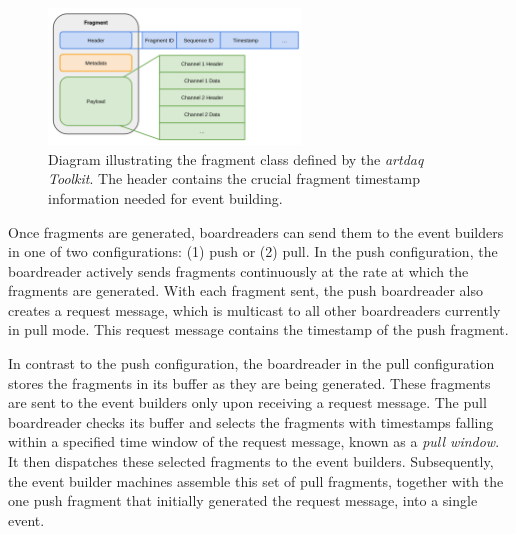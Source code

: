 \begin{figure}[tbp!] 
\centering    
\includegraphics[width=0.6\textwidth]{Fragment_Diagram}
\caption[FragmentDiagram]{
Diagram illustrating the fragment class defined by the \textit{artdaq Toolkit}. 
The header contains the crucial fragment timestamp information needed for event building.  
}
\label{fig:fragmentDiagram}
\end{figure}


Once fragments are generated, boardreaders can send them to the event builders in one of two configurations: (1) push or (2) pull.
In the push configuration, the boardreader actively sends fragments continuously at the rate at which the fragments are generated. 
With each fragment sent, the push boardreader also creates a request message, which is multicast to all other boardreaders currently in pull mode. 
This request message contains the timestamp of the push fragment.

In contrast to the push configuration, the boardreader in the pull configuration stores the fragments in its buffer as they are being generated. 
These fragments are sent to the event builders only upon receiving a request message.
The pull boardreader checks its buffer and selects the fragments with timestamps falling within a specified time window of the request message, known as a \textit{pull window}.
It then dispatches these selected fragments to the event builders. 
Subsequently, the event builder machines assemble this set of pull fragments, together with the one push fragment that initially generated the request message, into a single event.

